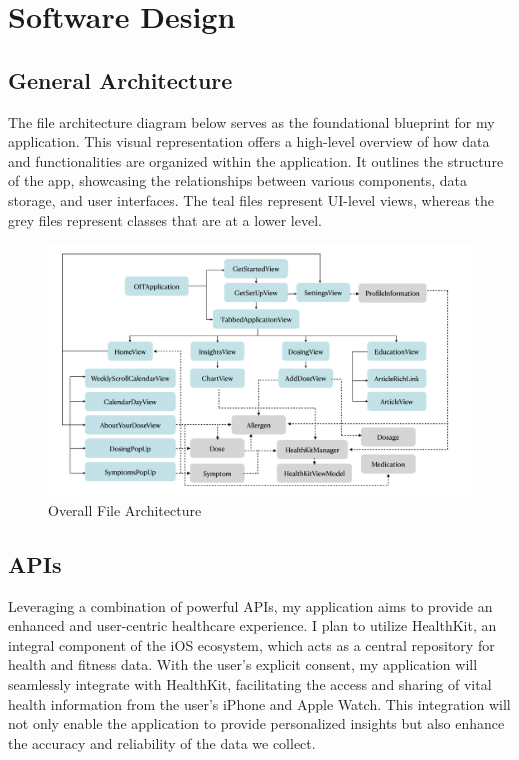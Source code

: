 \chapter{Software Design}

\section{General Architecture}

The file architecture diagram below serves as the foundational blueprint for my application. This visual representation offers a high-level overview of how data and functionalities are organized within the application. It outlines the structure of the app, showcasing the relationships between various components, data storage, and user interfaces. The teal files represent UI-level views, whereas the grey files represent classes that are at a lower level.

\begin{figure}[H]
    \centering
    \includegraphics[width=1\linewidth]{thesis/chapters/images/overallFileArchitecture.png}
    \caption{Overall File Architecture}
    \label{fig:overall-file-architecture}
\end{figure}

\section{APIs}

Leveraging a combination of powerful APIs, my application aims to provide an enhanced and user-centric healthcare experience. I plan to utilize HealthKit, an integral component of the iOS ecosystem, which acts as a central repository for health and fitness data. With the user's explicit consent, my application will seamlessly integrate with HealthKit, facilitating the access and sharing of vital health information from the user's iPhone and Apple Watch. This integration will not only enable the application to provide personalized insights but also enhance the accuracy and reliability of the data we collect.

